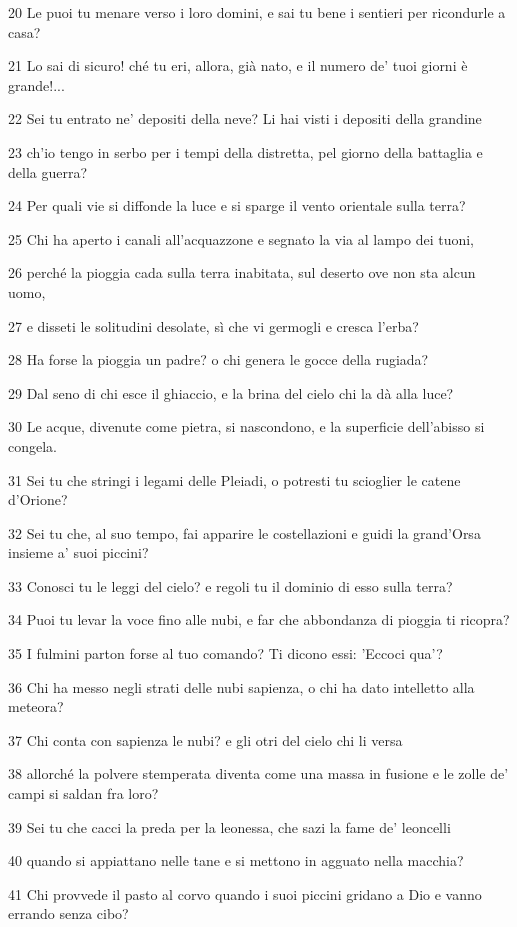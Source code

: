 \par 20 Le puoi tu menare verso i loro domini, e sai tu bene i sentieri per ricondurle a casa?
\par 21 Lo sai di sicuro! ché tu eri, allora, già nato, e il numero de' tuoi giorni è grande!...
\par 22 Sei tu entrato ne' depositi della neve? Li hai visti i depositi della grandine
\par 23 ch'io tengo in serbo per i tempi della distretta, pel giorno della battaglia e della guerra?
\par 24 Per quali vie si diffonde la luce e si sparge il vento orientale sulla terra?
\par 25 Chi ha aperto i canali all'acquazzone e segnato la via al lampo dei tuoni,
\par 26 perché la pioggia cada sulla terra inabitata, sul deserto ove non sta alcun uomo,
\par 27 e disseti le solitudini desolate, sì che vi germogli e cresca l'erba?
\par 28 Ha forse la pioggia un padre? o chi genera le gocce della rugiada?
\par 29 Dal seno di chi esce il ghiaccio, e la brina del cielo chi la dà alla luce?
\par 30 Le acque, divenute come pietra, si nascondono, e la superficie dell'abisso si congela.
\par 31 Sei tu che stringi i legami delle Pleiadi, o potresti tu scioglier le catene d'Orione?
\par 32 Sei tu che, al suo tempo, fai apparire le costellazioni e guidi la grand'Orsa insieme a' suoi piccini?
\par 33 Conosci tu le leggi del cielo? e regoli tu il dominio di esso sulla terra?
\par 34 Puoi tu levar la voce fino alle nubi, e far che abbondanza di pioggia ti ricopra?
\par 35 I fulmini parton forse al tuo comando? Ti dicono essi: 'Eccoci qua'?
\par 36 Chi ha messo negli strati delle nubi sapienza, o chi ha dato intelletto alla meteora?
\par 37 Chi conta con sapienza le nubi? e gli otri del cielo chi li versa
\par 38 allorché la polvere stemperata diventa come una massa in fusione e le zolle de' campi si saldan fra loro?
\par 39 Sei tu che cacci la preda per la leonessa, che sazi la fame de' leoncelli
\par 40 quando si appiattano nelle tane e si mettono in agguato nella macchia?
\par 41 Chi provvede il pasto al corvo quando i suoi piccini gridano a Dio e vanno errando senza cibo?

